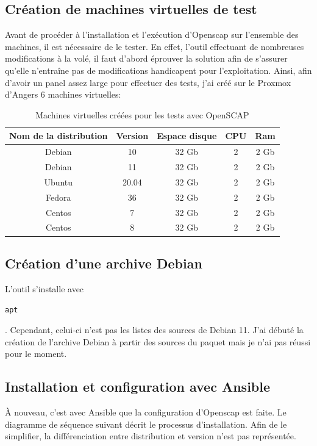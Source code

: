 \documentclass[12pt, a4paper, twoside]{article}
\begin{document}
\subsection{Création de machines virtuelles de test}
Avant de procéder à l'installation et l'exécution d'Openscap sur l'ensemble des machines, il est nécessaire de le tester. 
En effet, l'outil effectuant de nombreuses modifications à la volé, il faut d'abord éprouver la solution afin de s'assurer qu'elle n'entraîne pas de modifications handicapent pour l'exploitation.
Ainsi, afin d'avoir un panel assez large pour effectuer des tests, j'ai créé sur le \gls{Proxmox} d'Angers 6 machines virtuelles:
\begin{table}[ht!]
    \begin{center}
        \begin{tabular}{| c | c | c | c | c |}
        \hline
        Nom de la distribution & Version & Espace disque & CPU & Ram 
        \tabularnewline

        \hline
        Debian & 10 & 32 Gb & 2 & 2 Gb
        \tabularnewline

        \hline
        Debian & 11 & 32 Gb & 2 & 2 Gb
        \tabularnewline 

        \hline
        Ubuntu & 20.04 & 32 Gb & 2 & 2 Gb
        \tabularnewline

        \hline
        Fedora & 36 & 32 Gb & 2 & 2 Gb
        \tabularnewline

        \hline
        Centos & 7 & 32 Gb & 2 & 2 Gb
        \tabularnewline

        \hline
        Centos & 8 & 32 Gb & 2 & 2 Gb
        \tabularnewline
        \hline
        \end{tabular}
    \end{center}
    \caption{Machines virtuelles créées pour les tests avec \gls{OpenSCAP}}
\end{table}

\subsection{Création d'une archive Debian}
L'outil s'installe avec \begin{code} \texttt{\gls{apt}}\end{code}.
Cependant, celui-ci n'est pas les listes des sources de Debian 11. 
J'ai débuté la création de l'archive Debian à partir des sources du paquet mais je n'ai pas réussi pour le moment.

\subsection{Installation et configuration avec Ansible}
À nouveau, c'est avec \gls{Ansible} que la configuration d'Openscap est faite. 
Le diagramme de séquence suivant décrit le processus d'installation. 
Afin de le simplifier, la différenciation entre distribution et version n'est pas représentée.
\end{document}
